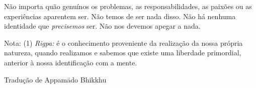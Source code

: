Não importa quão genuínos os problemas, as responsabilidades, as paixões
ou as experiências aparentem ser. Não temos de ser nada disso. Não há
nenhuma identidade que \emph{precisemos} ser. Não nos devemos apegar a
nada.

Nota: (1) \emph{Rigpa:} é o conhecimento proveniente da realização da
nossa própria natureza, quando realizamos e sabemos que existe uma
liberdade primordial, anterior à nossa identificação com a mente.

Tradução de Appamādo Bhikkhu
